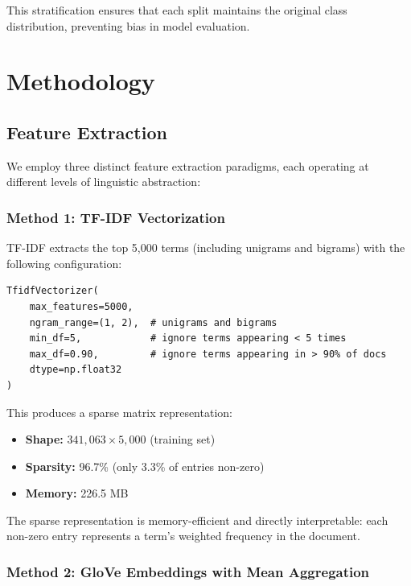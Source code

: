\documentclass[12pt, a4paper]{article}
\begin{document}
This stratification ensures that each split maintains the original class distribution, preventing bias in model evaluation.

\section{Methodology}

\subsection{Feature Extraction}

We employ three distinct feature extraction paradigms, each operating at different levels of linguistic abstraction:

\subsubsection{Method 1: TF-IDF Vectorization}

TF-IDF extracts the top 5,000 terms (including unigrams and bigrams) with the following configuration:

\begin{lstlisting}
TfidfVectorizer(
    max_features=5000,
    ngram_range=(1, 2),  # unigrams and bigrams
    min_df=5,            # ignore terms appearing < 5 times
    max_df=0.90,         # ignore terms appearing in > 90% of docs
    dtype=np.float32
)
\end{lstlisting}

This produces a sparse matrix representation:
\begin{itemize}
    \item \textbf{Shape:} $341,063 \times 5,000$ (training set)
    \item \textbf{Sparsity:} 96.7\% (only 3.3\% of entries non-zero)
    \item \textbf{Memory:} 226.5 MB
\end{itemize}

The sparse representation is memory-efficient and directly interpretable: each non-zero entry represents a term's weighted frequency in the document.

\subsubsection{Method 2: GloVe Embeddings with Mean Aggregation}
\end{document}
